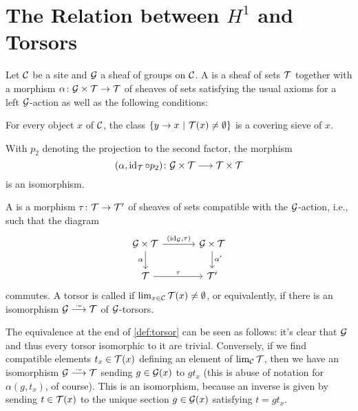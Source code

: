 \documentclass[a4paper, 10pt, oneside, DIV=9, chapterprefix=true, numbers=enddot, bibliography=totoc]{scrbook}
\begin{document}
\section{The Relation between \texorpdfstring{$H^1$}{H1} and Torsors}\label{sec:torsors}
\begin{defi}\label{def:torsor}
	Let $\mathcal{C}$ be a site and $\mathcal{G}$ a sheaf of groups on $\mathcal{C}$. A  is a sheaf of sets $\mathcal{T}$ together with a morphism $\alpha\colon \Gg\times \Tt\morphism \Tt$ of sheaves of sets satisfying the usual axioms for a left $\mathcal{G}$-action as well as the following conditions:
	\begin{alphanumerate}
		\item For every object $x$ of $\mathcal{C}$, the class $\left\{y\morphism x\st \Tt(x)\neq \emptyset\right\}$ is a covering sieve of $x$.
		\item With $p_2$ denoting the projection to the second factor, the morphism
		\begin{equation*}
			(\alpha,\id_\Tt\circ p_2)\colon \Gg\times \Tt\morphism \Tt\times\Tt
		\end{equation*}
		is an isomorphism.
	\end{alphanumerate}
	A  is a morphism $\tau\colon \Tt\morphism \Tt'$ of sheaves of sets compatible with the $\mathcal{G}$-action, i.e., such that the diagram
	\begin{equation*}
		\begin{tikzcd}
			\Gg\times \Tt\dar["\alpha"'] \rar["{(\id_\Gg,\tau)}"] &[1em] \Gg\times \Tt\dar["\smash{\alpha'}\vphantom{\alpha}"]\\
			\Tt\rar["\tau"] &[1em] \Tt'
		\end{tikzcd}
	\end{equation*}
	commutes. A torsor is called  if $\operatorname*{lim}_{x\in \mathcal{C}}\mathcal{T}(x)\neq \emptyset$, or equivalently, if there is an isomorphism $\Gg\isomorphism \Tt$ of $\mathcal{G}$-torsors.
\end{defi}
\begin{rem}
	The equivalence at the end of \cref{def:torsor} can be seen as follows: it's clear that $\mathcal{G}$ and thus every torsor isomorphic to it are trivial. Conversely, if we find compatible elements $t_x\in \mathcal{T}(x)$ defining an element of $\operatorname*{lim}_{\mathcal{C}}\mathcal{T}$, then we have an isomorphism $\Gg\isomorphism \Tt$ sending $g\in \mathcal{G}(x)$ to $gt_x$ (this is abuse of notation for $\alpha(g,t_x)$, of course). This is an isomorphism, because an inverse is given by sending $t\in \mathcal{T}(x)$ to the unique section $g\in \mathcal{G}(x)$ satisfying $t=gt_x$.
\end{rem}
\end{document}
